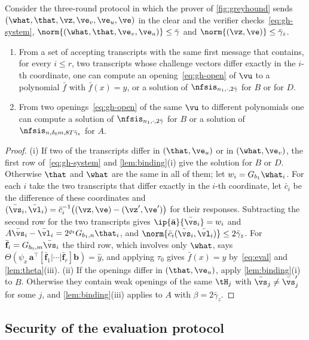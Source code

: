 \begin{lemma}\label{lem:greyhound}
Consider the three-round protocol in which the prover of \cref{fig:greyhound} sends $(\what,\that,\vz,\ve_v,\ve_u,\ve)$ in the clear and the verifier checks~\eqref{eq:gh-system}, $\norm{(\what,\that,\ve_v,\ve_u)}\le\bar\gamma$ and $\norm{(\vz,\ve)}\le\bar\gamma_z$.
\begin{enumerate}[label=(\roman*)]
\item From a set of accepting transcripts with the same first message that contains, for every $i\le r$, two transcripts whose challenge vectors differ exactly in the $i$-th coordinate, one can compute an opening~\eqref{eq:gh-open} of $\vu$ to a polynomial $\bar f$ with $\bar f(x)=y$, or a solution of $\nfsis_{n_1,\cdot,2\bar\gamma}$ for $B$ or for $D$.
\item From two openings~\eqref{eq:gh-open} of the same $\vu$ to different polynomials one can compute a solution of $\nfsis_{n_1,\cdot,2\bar\gamma}$ for $B$ or a solution of $\nfsis_{n,\delta_0m,8T\bar\gamma_z}$ for $A$.
\end{enumerate}
\end{lemma}
\begin{proof}
(i) If two of the transcripts differ in $(\that,\ve_u)$ or in $(\what,\ve_v)$, the first row of~\eqref{eq:gh-system} and \cref{lem:binding}(i) give the solution for $B$ or $D$. Otherwise $\that$ and $\what$ are the same in all of them; let $w_i=G_{b_1}\what_i$. For each $i$ take the two transcripts that differ exactly in the $i$-th coordinate, let $\bar c_i$ be the difference of these coordinates and $(\bar\vs_i,\bar\vl_i)=\bar c_i^{-1}\bigl((\vz,\ve)-(\vz',\ve')\bigr)$ for their responses. Subtracting the second row for the two transcripts gives $\ip{\bar{\mathbf a}}{\bar\vs_i}=w_i$ and $A\bar\vs_i-\bar\vl_i=2^{\varrho_t}G_{b_1,n}\that_i$, and $\norm{\bar c_i(\bar\vs_i,\bar\vl_i)}\le2\bar\gamma_z$. For $\bar{\mathbf f}_i=G_{b_0,m}\bar\vs_i$ the third row, which involves only $\what$, says $\Theta(\psi_x\,\mathbf a^\top[\bar{\mathbf f}_1|\cdots|\bar{\mathbf f}_r]\mathbf b)=\hat y$, and applying $\tau_0$ gives $\bar f(x)=y$ by~\eqref{eq:eval} and \cref{lem:theta}(iii).
(ii) If the openings differ in $(\that,\ve_u)$, apply \cref{lem:binding}(i) to $B$. Otherwise they contain weak openings of the same $\tH_j$ with $\bar\vs_j\ne\bar\vs'_j$ for some $j$, and \cref{lem:binding}(iii) applies to $A$ with $\beta=2\bar\gamma_z$.
\end{proof}

\subsection{Security of the evaluation protocol}\label{sec:pcs-sec}

